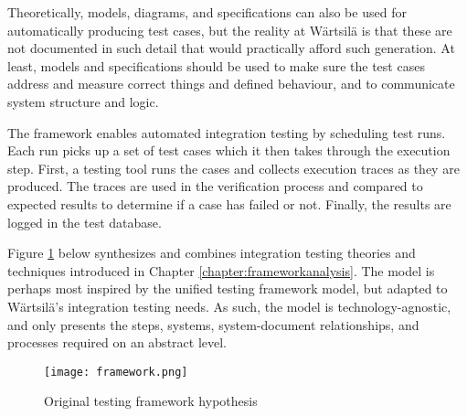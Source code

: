 \documentclass[12pt,a4paper,oneside,pdftex]{report}
\begin{document}
{Theoretically, models, diagrams, and specifications can also be used for automatically producing test cases, but the reality at Wärtsilä is that these are not documented in such detail that would practically afford such generation. At least, models and specifications should be used to make sure the test cases address and measure correct things and defined behaviour, and to communicate system structure and logic. 

The framework enables automated integration testing by scheduling test runs. Each run picks up a set of test cases which it then takes through the execution step. First, a testing tool runs the cases and collects execution traces as they are produced. The traces are used in the verification process and compared to expected results to determine if a case has failed or not. Finally, the results are logged in the test database.

Figure \ref{fig:framework} below synthesizes and combines integration testing theories and techniques introduced in Chapter \ref{chapter:frameworkanalysis}. The model is perhaps most inspired by the \citet{liu2009unified} unified testing framework model, but adapted to Wärtsilä's integration testing needs. As such, the model is technology-agnostic, and only presents the steps, systems, system-document relationships, and processes required on an abstract level.


\begin{figure}[H]
\centering
\texttt{[image: framework.png]}
\caption{Original testing framework hypothesis}
\label{fig:framework}
\end{figure}

\begin{comment}
\begin{figure}[H]
\centering
\pgfdeclarelayer{marx}
\pgfsetlayers{main,marx}
\xdefinecolor{lightgrey}{RGB}{220,220,220}
\xdefinecolor{blackish}{RGB}{30,30,30}
\begin{tikzpicture}[
    start chain=going below,    %
    node distance=6mm and 50mm, %
    ]
\tikzset{
  base/.style={draw, on chain, on grid, align=center, minimum height=4ex},
  proc/.style={base, rectangle, minimum height=4em, text width=7em},
  sut/.style={base, circle, text width=5em, fill = blackish, text = white},
  syst/.style={base, cylinder, shape border rotate=90,  aspect=.2, minimum height=5em, text width=5em},
  file/.style={base, rectangle, shape border rotate=90, minimum height=4em, text width=3em, fill = lightgrey},
  data/.style={base, trapezium, trapezium left angle=70, trapezium right angle=-70, minimum height=1cm}, 
  line/.style={draw, thick, -latex'},
  dots/.style={draw, dotted, -latex'}
}


\end{comment}}
\end{document}
